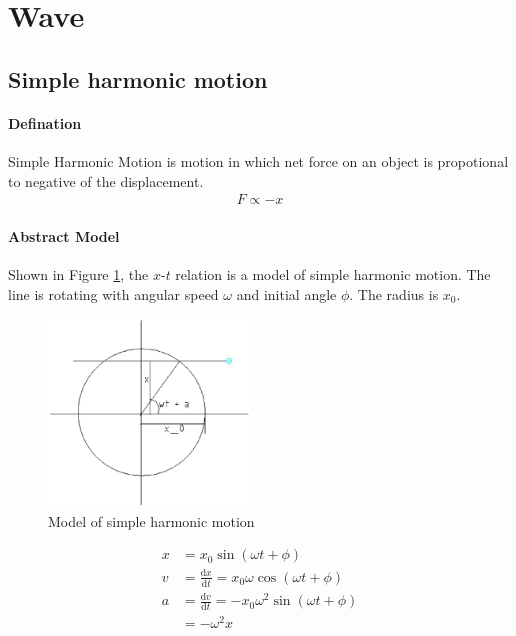 \section{Wave}
    \subsection{Simple harmonic motion}
        \paragraph{Defination}
            Simple Harmonic Motion is motion in which net force on an object is propotional to negative of the displacement.
            \begin{align}
                F \propto -x
            \end{align}

        \paragraph{Abstract Model}
            Shown in Figure \ref{shm_md}, the $x$-$t$ relation is a model of simple harmonic motion. The line is rotating with angular speed $\omega$ and initial angle $\phi$. The radius is $x_0$.
            \begin{figure}[H]
                \begin{center}
                    \includegraphics[height=5cm]{wave_charts/shm_circ.eps}
                \end{center}
                \caption{Model of simple harmonic motion}
                \label{shm_md}
            \end{figure}

        
            \begin{align}
                x &= x_0 \sin (\omega t + \phi) \\
                v &= \frac{\mathrm{d} x}{\mathrm{d} t} = x_0 \omega \cos (\omega t + \phi) \\
                a &= \frac{\mathrm{d} v}{\mathrm{d} t} = - x_0 \omega^2 \sin (\omega t + \phi) \\
                  &= - \omega^2 x
            \end{align}

